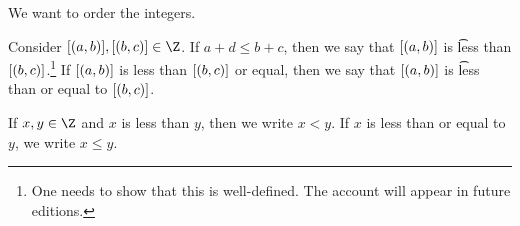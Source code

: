 

We want to order the integers.


Consider $\eqc{(a, b)}, \eqc{(b, c)} \in \Z$.
If $a + d \leq b + c$, then we say that
$[(a, b)]$ is \t{less than} $[(b, c)]$.\footnote{One needs to show that this is well-defined. The account will appear in future editions.}
If $[(a, b)]$ is less than $[(b, c)]$ or equal, then we say that $[(a, b)]$ is \t{less than or equal to} $[(b, c)]$.


If $x, y \in \Z$ and $x$ is less than $y$, then we write $x < y$.
If $x$ is less than or equal to $y$, we write $x \leq y$.

\blankpage 